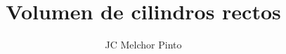 \documentclass[12pt,addpoints,answers]{guia}
\title{Volumen de cilindros rectos}
\author{JC Melchor Pinto}
\begin{document}
\pagestyle{headandfoot}

\INFO
\begin{multicols}{2}
    
    
    
    
\end{multicols}
\begin{questions}
    \questionboxed[10]{}
    \questionboxed[15]{}
    \questionboxed[15]{}
    \questionboxed[5]{}
    \questionboxed[5]{}
    \questionboxed[5]{}
    \questionboxed[5]{}
    \questionboxed[5]{}
    \questionboxed[5]{}
    \questionboxed[5]{}
    \questionboxed[5]{}
    \questionboxed[5]{}
    \questionboxed[5]{}
    \questionboxed[5]{}
    \questionboxed[5]{}
\end{questions}

\end{document}

